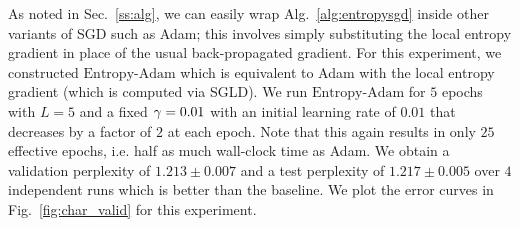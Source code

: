 \documentclass[10pt]{article}
\newcommand{\entropyadam}{\mathrm{Entropy}\textrm{-}\mathrm{Adam}}
\begin{document}
As noted in Sec.~\ref{ss:alg}, we can easily wrap Alg.~\ref{alg:entropysgd} inside other variants of SGD such as Adam; this involves simply substituting the local entropy gradient in place of the usual back-propagated gradient. For this experiment, we constructed $\entropyadam$ which is equivalent to Adam with the local entropy gradient (which is computed via SGLD). We run $\entropyadam$ for $5$ epochs with $L = 5$ and a fixed $\gamma = 0.01$ with an initial learning rate of $0.01$ that decreases by a factor of $2$ at each epoch. Note that this again results in only $25$ effective epochs, i.e. half as much wall-clock time as Adam. We obtain a validation perplexity of $1.213 \pm 0.007$ and a test perplexity of $1.217 \pm 0.005$ over $4$ independent runs which is better than the baseline. We plot the error curves in Fig.~\ref{fig:char_valid} for this experiment.
\end{document}
